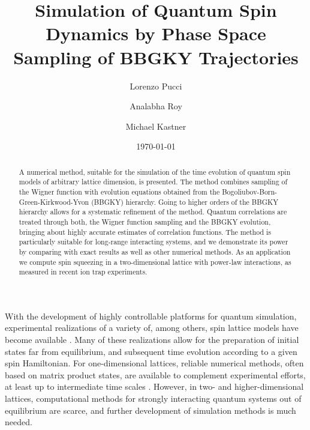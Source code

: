 \documentclass[aps,prl,showpacs,amsmath,amssymb,superscriptaddress,reprint,10pt]{revtex4-1}
\begin{document}

\title{Simulation of Quantum Spin Dynamics by Phase Space Sampling of BBGKY Trajectories}  

\author{Lorenzo Pucci} 

\author{Analabha Roy} 

\author{Michael Kastner} 

\date{\today}

\begin{abstract}
A numerical method, suitable for the simulation of the time evolution of quantum spin models of arbitrary lattice dimension, is presented. The method combines sampling of the Wigner function with evolution equations obtained from the Bogoliubov-Born-Green-Kirkwood-Yvon (BBGKY) hierarchy. Going to higher orders of the BBGKY hierarchy allows for a systematic refinement of the method. Quantum correlations are treated through both, the Wigner function sampling and the BBGKY evolution, bringing about highly accurate estimates of correlation functions. The method is particularly suitable for long-range interacting systems, and we demonstrate its power by comparing with exact results as well as other numerical methods. As an application we compute spin squeezing in a two-dimensional lattice with power-law interactions, as measured in recent ion trap experiments.
\end{abstract}


\maketitle 

With the development of highly controllable platforms for quantum simulation, experimental realizations of a variety of, among others, spin lattice models have become available \cite{Simon_etal11,*Struck_etal11,*Labuhn,Britton_etal12,Schauss_etal12,*Islam_etal13,*dePaz_etal13,*Yan_etal13,*Jurcevic_etal14,*Richerme_etal14}. Many of these realizations allow for the preparation of initial states far from equilibrium, and  subsequent time evolution according to a given spin Hamiltonian. For one-dimensional lattices, reliable numerical methods, often based on matrix product states, are available to complement experimental efforts, at least up to intermediate time scales \cite{Schollwoeck11}. However, in two- and higher-dimensional lattices, computational methods for strongly interacting quantum systems out of equilibrium are scarce, and further development of simulation methods is much needed.
\end{document}
